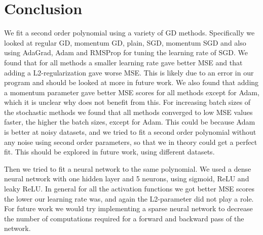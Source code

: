 \section{Conclusion}

We fit a second order polynomial using a variety of GD methods. Specifically we
looked at regular GD, momentum GD, plain, SGD, momentum SGD and also using AdaGrad, Adam 
and RMSProp for tuning the learning rate of SGD. We found that for all methods
a smaller learning rate gave better MSE and that adding a L2-regularization
gave worse MSE. This is likely due to an error in our program and should be
looked at more in future work. We also found that adding a momentum parameter
gave better MSE scores for all methods except for Adam, which it is unclear why
does not benefit from this.
For increasing batch sizes of the stochastic methods we found that all methods
converged to low MSE values faster, the higher the batch sizes, except for
Adam. This could be because Adam is better at noisy datasets, and we tried to
fit a second order polynomial without any noise using second order parameters,
so that we in theory could get a perfect fit. This should be explored in future
work, using different datasets.


Then we tried to fit a neural network to the same polynomial. We used a dense
neural network with one hidden layer and 5 neurons, using sigmoid, ReLU and
leaky ReLU. In general for all the activation functions we got better MSE
scores the lower our learning rate was, and again the L2-parameter did not play
a role. For future work we would try implementing a sparse neural network to
decrease the number of computations required for a forward and backward pass of
the network. 



